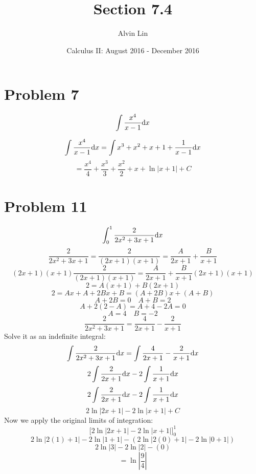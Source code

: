 \documentclass[letterpaper, 12pt]{math}
\title{Section 7.4}
\author{Alvin Lin}
\date{Calculus II: August 2016 - December 2016}
\begin{document}
\maketitle

\section*{Problem 7}
\[ \int{\frac{x^{4}}{x-1}\mathrm{d}{x}} \]
\begin{center}
\end{center}
\[ \int{\frac{x^{4}}{x-1}\mathrm{d}{x}} =
   \int{x^{3}+x^{2}+x+1+\frac{1}{x-1}\mathrm{d}{x}} \]
\[ = \frac{x^{4}}{4}+\frac{x^{3}}{3}+\frac{x^{2}}{2}+x+\ln|x+1|+C \]

\section*{Problem 11}
\[ \int_{0}^{1}{\frac{2}{2x^{2}+3x+1}\mathrm{d}{x}} \]
\[ \frac{2}{2x^{2}+3x+1} = \frac{2}{(2x+1)(x+1)} =
   \frac{A}{2x+1}+\frac{B}{x+1} \]
\[ (2x+1)(x+1)\frac{2}{(2x+1)(x+1)} = \frac{A}{2x+1}+\frac{B}{x+1}(2x+1)(x+1) \]
\[ 2 = A(x+1)+B(2x+1) \]
\[ 2 = Ax + A + 2Bx + B = (A+2B)x+(A+B) \]
\[ A+2B = 0 \quad A+B = 2 \]
\[ A+2(2-A) = A+4-2A = 0 \]
\[ A = 4 \quad B = -2 \]
\[ \frac{2}{2x^{2}+3x+1} = \frac{4}{2x+1}-\frac{2}{x+1} \]
Solve it as an indefinite integral:
\[ \int{\frac{2}{2x^{2}+3x+1}\mathrm{d}{x}} =
   \int{\frac{4}{2x+1}-\frac{2}{x+1}\mathrm{d}{x}} \]
\[ 2\int{\frac{2}{2x+1}\mathrm{d}{x}}-2\int{\frac{1}{x+1}\mathrm{d}{x}} \]
\[ 2\int{\frac{2}{2x+1}\mathrm{d}{x}}-2\int{\frac{1}{x+1}\mathrm{d}{x}} \]
\[ 2\ln|2x+1|-2\ln|x+1|+C \]
Now we apply the original limits of integration:
\[ \bigg[2\ln|2x+1|-2\ln|x+1|\bigg]_{0}^{1} \]
\[ 2\ln|2(1)+1|-2\ln|1+1|-(2\ln|2(0)+1|-2\ln|0+1|) \]
\[ 2\ln|3|-2\ln|2|-(0) \]
\[ = \ln|\frac{9}{4}| \]
\end{document}
